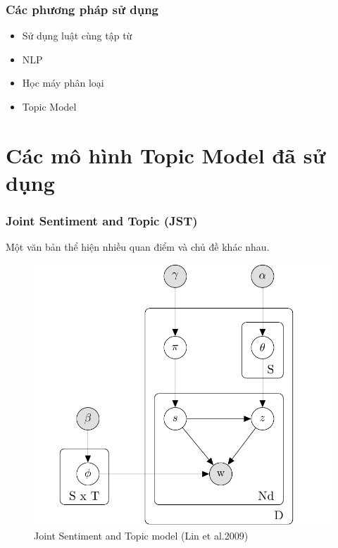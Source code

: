 \documentclass{beamer}
\begin{document}
\begin{frame}
\frametitle{Các phương pháp sử dụng}

\begin{itemize}
\item Sử dụng luật cùng tập từ
\item NLP
\item Học máy phân loại
\item Topic Model
\end{itemize}
\end{frame}

\section{Các mô hình Topic Model đã sử dụng}


\begin{frame}
\frametitle{Joint Sentiment and Topic (JST) }
Một văn bản thể hiện nhiều quan điểm và chủ đề khác nhau.
\begin{center}
\begin{figure}
\includegraphics[scale=0.2]{Image/JST.png}
\caption*{Joint Sentiment and Topic model (Lin et al.2009)}
\label{labels:1}
\end{figure}
\end{center}
\end{frame}
\end{document}
